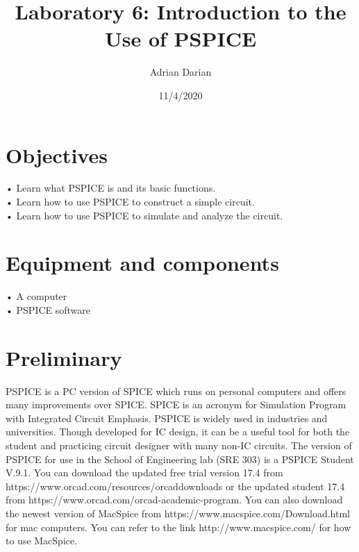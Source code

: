 \documentclass[a4paper]{article}
\title{Laboratory 6: Introduction to the Use of PSPICE}
\author{Adrian Darian}
\date{11/4/2020}
\begin{document}
  
\maketitle
  
\section*{Objectives}
• Learn what PSPICE is and its basic functions. \\
• Learn how to use PSPICE to construct a simple circuit. \\
• Learn how to use PSPICE to simulate and analyze the circuit. \\

\section*{Equipment and components}
• A computer \\
• PSPICE software \\

\section*{Preliminary}
PSPICE is a PC version of SPICE which runs on personal computers and offers many improvements over SPICE. SPICE is an acronym for Simulation Program with Integrated Circuit Emphasis. PSPICE is widely used in industries and universities. Though developed for IC design, it can be a useful tool for both the student and practicing circuit designer with many non-IC circuits. The version of PSPICE for use in the School of Engineering lab (SRE 303) is a PSPICE Student V.9.1. You can download the updated free trial version 17.4 from https://www.orcad.com/resources/orcaddownloads or the updated student 17.4 from https://www.orcad.com/orcad-academic-program. You can also download the newest version of MacSpice from https://www.macspice.com/Download.html for mac computers. You can refer to the link http://www.macspice.com/ for how to use MacSpice.
\end{document}
